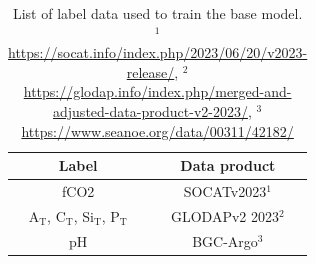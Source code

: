 \documentclass{article}
\begin{document}
	\begin{table}
		\centering
		\bgroup
		\def\arraystretch{1.5}
		\begin{tabular}{c|c}
			Label & Data product \\ \hline
			fCO2 & SOCATv2023$^1$ \\
			A$_\text{T}$, C$_\text{T}$, Si$_\text{T}$, P$_\text{T}$ & GLODAPv2 2023$^2$ \\
			pH & BGC-Argo$^3$
		\end{tabular}
		\egroup
		\caption{List of label data used to train the base model. $^1$\url{https://socat.info/index.php/2023/06/20/v2023-release/}, $^2$\url{https://glodap.info/index.php/merged-and-adjusted-data-product-v2-2023/}, $^3$\url{https://www.seanoe.org/data/00311/42182/}}
		\label{tab:label_data}
	\end{table}
	\medskip
	
	
	
\end{document}
